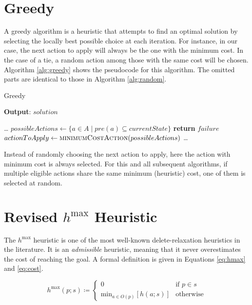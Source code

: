 \section{Greedy}
A greedy algorithm is a heuristic that attempts to find an optimal solution by selecting the locally
best possible choice at each iteration. For instance, in our case, the next action to apply will
always be the one with the minimum cost. In the case of a tie, a random action among those with the same cost
will be chosen.
Algorithm \ref{alg:greedy} shows the pseudocode for this algorithm. The omitted parts are identical to those in Algorithm \ref{alg:random}.

\begin{algorithm}
	\caption{Greedy}
	\label{alg:greedy}
	\hspace*{0.5em} \textbf{Output}: $solution$
	\begin{algorithmic}[1]
		\State \dots
		\State $possibleActions \gets \{a \in A \mid pre(a) \subseteq currentState\}$
		\State \textbf{return} $failure$
		\EndIf
		\State $actionToApply \gets \Call{minimumCostAction}{possibleActions}$
		\State \dots
		\EndProcedure
	\end{algorithmic}
\end{algorithm}

Instead of randomly choosing the next action to apply, here the action with minimum cost is always selected.
For this and all subsequent algorithms, if multiple eligible actions share the same minimum (heuristic) cost,
one of them is selected at random.

\section{Revised $h^{\max}$ Heuristic}
\label{sec:hmax}
The $h^{\max}$ heuristic is one of the most well-known delete-relaxation heuristics in the literature.
It is an \textit{admissible} heuristic, meaning that it never overestimates the cost of reaching the goal.
A formal definition is given in Equations \ref{eq:hmax} and \ref{eq:cost}.

\begin{equation}
	\label{eq:hmax}
	h^{\max}\left(p;s\right) \coloneqq \begin{cases}
		0                                                                & \text{if $p \in s$} \\
		\text{min}_{a \in O\left(p\right)}\left[h\left(a;s\right)\right] & \text{otherwise}
	\end{cases}
\end{equation}

